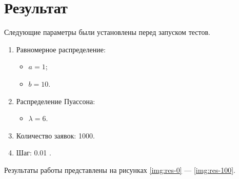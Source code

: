 \chapter{Результат}

Следующие параметры были установлены перед запуском тестов.
\begin{enumerate}
	\item Равномерное распределение:
	\begin{itemize}
		\item $ a = 1 $;
		\item $ b = 10 $.
	\end{itemize}
	\item Распределение Пуассона:
	\begin{itemize}
		\item $ \lambda = 6 $.
	\end{itemize}
	\item Количество заявок: 1000.
	\item Шаг: 0.01 .
\end{enumerate}

Результаты работы представлены на рисунках \ref{img:res-0} --- \ref{img:res-100}.

{}
{}
\clearpage
{}
{}

